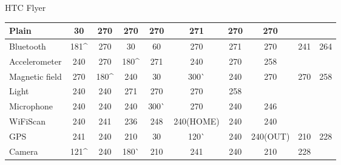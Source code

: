    HTC Flyer\\
\begin{table}
    \begin{tabular}{| l | c | c | c | c | c | c | c | c | c |}
    \hline
    Plain          & \cellcolor{red!25}30  & 270  & 270   & 270   & 271       & 270 & 270      & ~   & ~   \\ \hline
    Bluetooth      & 181\^ & 270  & \cellcolor{red!25}30   & \cellcolor{red!25}60   & 270       & 271 & 270      & 241 & 264 \\ \hline
    Accelerometer  & 240  & 270  & 180\^ & 271   & 240       & 270 & 258      & ~   & ~   \\ \hline
    Magnetic field & 270  & 180\^ & 240   & \cellcolor{red!25}30   & 300^^   & 240 & 270      & 270 & 258 \\ \hline
    Light          & 240  & 240  & 271   & 270   & 270       & 258 & ~        & ~   & ~   \\ \hline
    Microphone     & 240  & 240  & 240   & 300^^ & 270       & 240 & 246      & ~   & ~   \\ \hline
    WiFiScan       & 240  & 241  & 236   & 248   & 240(HOME) & 240 & 240      & ~   & ~   \\ \hline
    GPS            & 241  & 240  & 210   & \cellcolor{red!25}30   & 120^^   & 240 & 240(OUT) & 210 & 228 \\ \hline
    Camera         & 121\^ & 240  & 180^^ & 210   & 241       & 240 & 210      & 228 & ~   \\ \hline
    \end{tabular}
\end{table}

